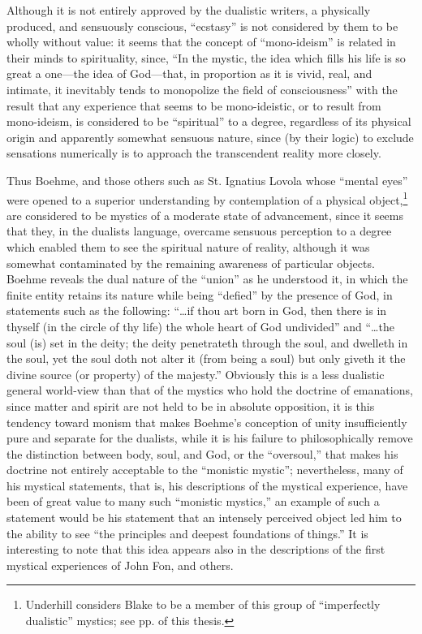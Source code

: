 Although it is not entirely approved by the dualistic
writers, a physically produced, and sensuously conscious,
\enquote{ecstasy} is not considered by them to be wholly without
value: it seems that the concept of \enquote{mono-ideism} is related
in their minds to spirituality, since, \enquote{In the mystic, the
idea which fills his life is so great a one---the idea of God---that,
in proportion as it is vivid, real, and intimate, it
inevitably tends to monopolize the field of consciousness}\supercite{underhill:mysticism}
with the result that any experience that seems to be mono-ideistic,
or to result from mono-ideism, is considered to be
\enquote{spiritual} to a degree, regardless of its physical origin
and apparently somewhat sensuous nature, since (by their
logic) to exclude sensations numerically is to approach
the transcendent reality more closely.

Thus Boehme, and those others such as St. Ignatius Lovola
whose \enquote{mental eyes} were opened to a superior understanding
by contemplation of a physical object,\footnote{Underhill considers Blake to be a member of this group of \enquote{imperfectly dualistic} mystics; see pp. \pageref{self:07} of this thesis.}
are considered to be mystics of a moderate state of advancement, since it seems that
they, in the dualists language, overcame sensuous perception
to a degree which enabled them to see the spiritual nature of
reality, although it was somewhat contaminated by the remaining
awareness of particular objects. Boehme reveals the dual
nature of the \enquote{union} as he understood it, in which the
finite entity retains its nature while being \enquote{defied} by the
presence of God, in statements such as the following:
\enquote{\dots if thou art born in God, then there is in thyself (in the
circle of thy life) the whole heart of God undivided}\supercite{underhill:mysticism}
and \enquote{\dots the soul (is) set in the deity; the deity penetrateth
through the soul, and dwelleth in the soul, yet the soul doth
not alter it (from being a soul) but only giveth it the
divine source (or property) of the majesty.}\supercite{underhill:mysticism}
Obviously this is a less dualistic general world-view than that of the
mystics who hold the doctrine of emanations, since matter
and spirit are not held to be in absolute opposition, it is
this tendency toward monism that makes Boehme's conception of
unity insufficiently pure and separate for the dualists,
while it is his failure to philosophically remove the distinction
between body, soul, and God, or the \enquote{oversoul,} that
makes his doctrine not entirely acceptable to the \enquote{monistic
mystic}; nevertheless, many of his mystical statements,
that is, his descriptions of the mystical experience, have
been of great value to many such \enquote{monistic mystics,} an
example of such a statement would be his statement that an
intensely perceived object led him to the ability to see
\enquote{the principles and deepest foundations of things.}\supercite{underhill:mysticism}
It is interesting to note that this idea appears also in the descriptions
of the first mystical experiences of John Fon, and others.

